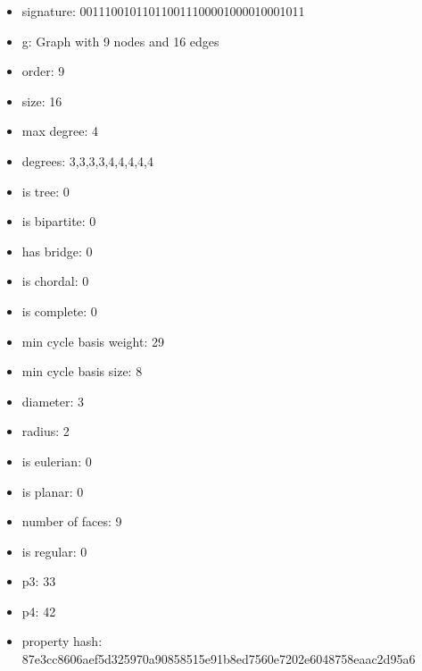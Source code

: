 \newpage
\begin{figure}
\end{figure}
\begin{itemize}
\item signature: 001110010110110011100001000010001011
\item g: Graph with 9 nodes and 16 edges
\item order: 9
\item size: 16
\item max degree: 4
\item degrees: 3,3,3,3,4,4,4,4,4
\item is tree: 0
\item is bipartite: 0
\item has bridge: 0
\item is chordal: 0
\item is complete: 0
\item min cycle basis weight: 29
\item min cycle basis size: 8
\item diameter: 3
\item radius: 2
\item is eulerian: 0
\item is planar: 0
\item number of faces: 9
\item is regular: 0
\item p3: 33
\item p4: 42
\item property hash: 87e3cc8606aef5d325970a90858515e91b8ed7560e7202e6048758eaac2d95a6
\end{itemize}
